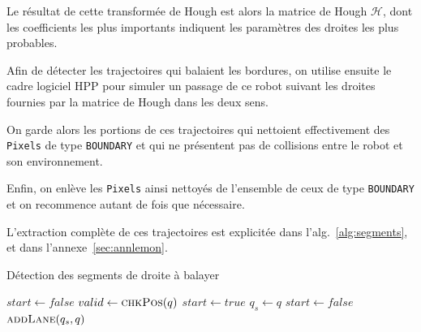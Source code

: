 \documentclass[french,A4paper,]{book}
\begin{document}
Le résultat de cette transformée de Hough est alors la matrice de Hough
\(\mathcal{H}\), dont les coefficients les plus importants indiquent les
paramètres des droites les plus probables.

Afin de détecter les trajectoires qui balaient les bordures, on utilise
ensuite le cadre logiciel HPP pour simuler un passage de ce robot
suivant les droites fournies par la matrice de Hough dans les deux sens.

On garde alors les portions de ces trajectoires qui nettoient
effectivement des \texttt{Pixels} de type \texttt{BOUNDARY} et qui ne
présentent pas de collisions entre le robot et son environnement.

Enfin, on enlève les \texttt{Pixels} ainsi nettoyés de l'ensemble de
ceux de type \texttt{BOUNDARY} et on recommence autant de fois que
nécessaire.

L'extraction complète de ces trajectoires est explicitée dans
l'alg.~\ref{alg:segments}, et dans l'annexe~\ref{sec:annlemon}.

\begin{algorithm}
\caption{Détection des segments de droite à balayer}
\label{alg:segments}
\begin{algorithmic}[1]

\State{}
\State{}
\EndFor
\EndWhile

\State $start \gets false$
\State $valid \gets \Call{chkPos}{q}$
\State $start \gets true$
\State $q_s \gets q$
\State $start \gets false$
\State $\Call{addLane}{q_s, q}$
\EndIf
\EndFor
\EndProcedure

\end{algorithmic}
\end{algorithm}
\end{document}
